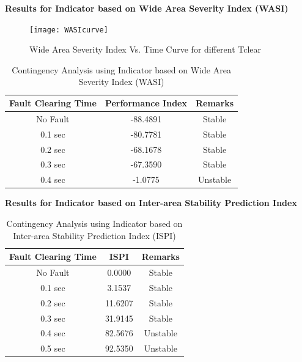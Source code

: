 \documentclass [xcolor=svgnames, t] {beamer}
\begin{document}
\begin{frame}{\textbf{Results for Indicator based on Wide Area Severity Index (WASI)}}
\begin{figure}
    \centering
    \texttt{[image: WASIcurve]}
\caption{Wide Area Severity Index Vs. Time Curve for different Tclear}
\end{figure}
\end{frame}

\begin{frame}%
\begin{table}[H]
\renewcommand{\arraystretch}{1}
\caption{Contingency Analysis using Indicator based on Wide Area Severity Index (WASI)}
\begin{center}
\begin{tabular}{|c|c|c|}
\hline
 \textbf{Fault Clearing Time} & \textbf{Performance Index} & \textbf{Remarks}  \\ \hline
No Fault & -88.4891  & Stable \\ \hline
 0.1 sec & -80.7781  & Stable \\ \hline
 0.2 sec & -68.1678  & Stable \\ \hline
 0.3 sec & -67.3590  & Stable \\ \hline
 0.4 sec & -1.0775  & Unstable \\ \hline
\end{tabular}
\end{center}
\end{table}
\end{frame}

\begin{frame}{\textbf{Results for Indicator based on Inter-area Stability Prediction Index}}
\begin{table}[H]
\renewcommand{\arraystretch}{1}
\caption{Contingency Analysis using Indicator based on Inter-area Stability Prediction Index (ISPI)}
\begin{center}
\begin{tabular}{|c|c|c|}
\hline
 \textbf{Fault Clearing Time} & \textbf{ISPI} & \textbf{Remarks}  \\ \hline
 No Fault & 0.0000  & Stable \\ \hline
 0.1 sec & 3.1537  & Stable \\ \hline
 0.2 sec & 11.6207  & Stable \\ \hline
 0.3 sec & 31.9145  & Stable \\ \hline
 0.4 sec & 82.5676  & Unstable \\ \hline
 0.5 sec & 92.5350  & Unstable \\ \hline
\end{tabular}
\end{center}
\end{table}
\end{frame}
\end{document}
